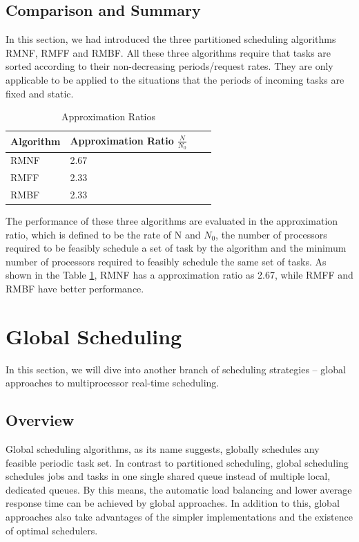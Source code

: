 \documentclass[preprint,12pt]{elsarticle}
\begin{document}
\subsection{Comparison and Summary}
In this section, we had introduced the three partitioned scheduling algorithms RMNF, RMFF and RMBF. All these three algorithms require that tasks are sorted according to their non-decreasing periods/request rates. They are only applicable to be applied to the situations that the periods of incoming tasks are fixed and static. 
\begin{table}
\begin{center}
\caption{Approximation Ratios}
\label{table: app_ratio}
 \begin{tabular}{| l | l | l | l |}
    \hline
    {\bf Algorithm} & {\bf Approximation Ratio $\frac{N}{N_0}$} \\ \hline
    RMNF & 2.67 \\ \hline
    RMFF & 2.33 \\ \hline
    RMBF & 2.33 \\ \hline
 \end{tabular}
 \end{center}
\end{table} 
The performance of these three algorithms are evaluated in the approximation ratio, which is defined to be the rate of N and $N_0$, the number of processors required to be feasibly schedule a set of task by the algorithm and the minimum number of processors required to feasibly schedule the same set of tasks. As shown in the Table \ref{table: app_ratio}, RMNF has a approximation ratio as 2.67, while RMFF and RMBF have better performance.

\section{Global Scheduling} \label{S:4}
In this section, we will dive into another branch of scheduling strategies --
global approaches to multiprocessor real-time scheduling.

\subsection{Overview}
Global scheduling algorithms, as its name suggests, globally schedules any
feasible periodic task set. In contrast to partitioned scheduling, global
scheduling schedules jobs and tasks in one single shared queue instead of
multiple local, dedicated queues. By this means, the automatic load balancing
and lower average response time can be achieved by global approaches. In
addition to this, global approaches also take advantages of the simpler
implementations and the existence of optimal schedulers. 
\end{document}

